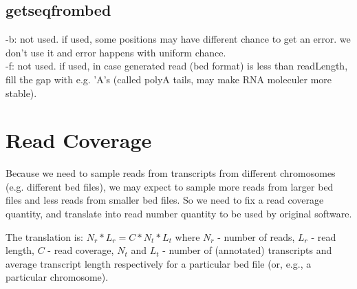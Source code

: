 \documentclass{article}
\begin{document}
\subsection{getseqfrombed}\label{sec_getseqfrombed}

-b: not used. if used, some positions may have different chance to get an error. we don't use it and error happens with uniform chance.\\

-f: not used. if used, in case generated read (bed format) is less than readLength, fill the gap with e.g. 'A's (called polyA tails, may make RNA moleculer more stable). \\

\section{Read Coverage}

Because we need to sample reads from transcripts from different chromosomes (e.g. different bed files), we may expect to sample more reads from larger bed files and less reads from smaller bed files. So we need to fix a read coverage quantity, and translate into read number quantity to be used by original software.

The translation is: $N_r*L_r=C*N_t*L_t$ where $N_r$ - number of reads, $L_r$ - read length, $C$ - read coverage, $N_t$ and $L_t$ - number of (annotated) transcripts and average transcript length respectively for a particular bed file (or, e.g., a particular chromosome).
\end{document}
